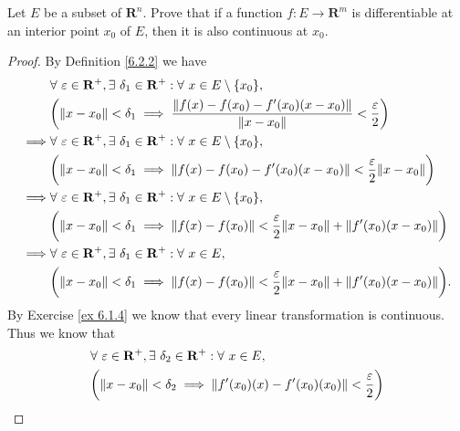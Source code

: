 \begin{exercise}\label{ex 6.4.2}
    Let \(E\) be a subset of \(\mathbf{R}^n\).
    Prove that if a function \(f : E \to \mathbf{R}^m\) is differentiable at an interior point \(x_0\) of \(E\), then it is also continuous at \(x_0\).
\end{exercise}

\begin{proof}
    By Definition \ref{6.2.2} we have
    \begin{align*}
                 & \forall\ \varepsilon \in \mathbf{R}^+, \exists\ \delta_1 \in \mathbf{R}^+ : \forall\ x \in E \setminus \{x_0\},                           \\
                 & \bigg(\norm*{x - x_0} < \delta_1 \implies \frac{\norm*{f(x) - f(x_0) - f'(x_0)(x - x_0)}}{\norm*{x - x_0}} < \frac{\varepsilon}{2}\bigg)  \\
        \implies & \forall\ \varepsilon \in \mathbf{R}^+, \exists\ \delta_1 \in \mathbf{R}^+ : \forall\ x \in E \setminus \{x_0\},                           \\
                 & \bigg(\norm*{x - x_0} < \delta_1 \implies \norm*{f(x) - f(x_0) - f'(x_0)(x - x_0)} < \frac{\varepsilon}{2} \norm*{x - x_0}\bigg)          \\
        \implies & \forall\ \varepsilon \in \mathbf{R}^+, \exists\ \delta_1 \in \mathbf{R}^+ : \forall\ x \in E \setminus \{x_0\},                           \\
                 & \bigg(\norm*{x - x_0} < \delta_1 \implies \norm*{f(x) - f(x_0)} < \frac{\varepsilon}{2} \norm*{x - x_0} + \norm*{f'(x_0)(x - x_0)}\bigg)  \\
        \implies & \forall\ \varepsilon \in \mathbf{R}^+, \exists\ \delta_1 \in \mathbf{R}^+ : \forall\ x \in E,                                             \\
                 & \bigg(\norm*{x - x_0} < \delta_1 \implies \norm*{f(x) - f(x_0)} < \frac{\varepsilon}{2} \norm*{x - x_0} + \norm*{f'(x_0)(x - x_0)}\bigg).
    \end{align*}
    By Exercise \ref{ex 6.1.4} we know that every linear transformation is continuous.
    Thus we know that
    \begin{align*}
                 & \forall\ \varepsilon \in \mathbf{R}^+, \exists\ \delta_2 \in \mathbf{R}^+ : \forall\ x \in E,                                                  \\
                 & \bigg(\norm*{x - x_0} < \delta_2 \implies \norm*{f'(x_0)(x) - f'(x_0)(x_0)} < \frac{\varepsilon}{2}\bigg)                                      \\

\end{align*}
\end{proof}
